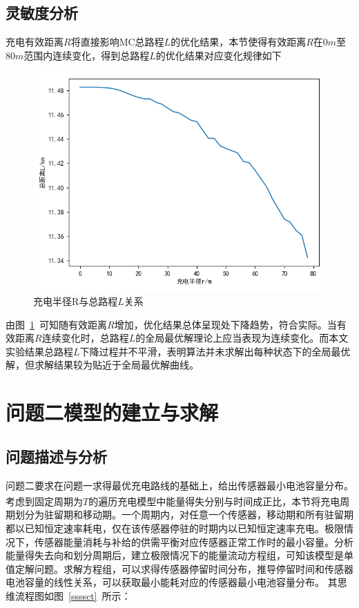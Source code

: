 \documentclass{whutmod}
\newcommand{\upcite}[1]{\textsuperscript{\cite{#1}}}
\begin{document}
	\subsection{灵敏度分析}
       充电有效距离$R$将直接影响MC总路程$L$的优化结果，本节使得有效距离$R$在$0m$至$80m$范围内连续变化，得到总路程$L$的优化结果对应变化规律如下
	    \begin{figure}[H]
		\centering
		\includegraphics[width=.8\textwidth]{figures/ssss.png}
		\caption{充电半径R与总路程$L$关系}\label{ssssssssssssss}
		\end{figure}
	由图~\ref{ssssssssssssss}~可知随有效距离$R$增加，优化结果总体呈现处下降趋势，符合实际。当有效距离$R$连续变化时，总路程$L$的全局最优解理论上应当表现为连续变化。而本文实验结果总路程$L$下降过程并不平滑，表明算法并未求解出每种状态下的全局最优解，但求解结果较为贴近于全局最优解曲线。
	\section{问题二模型的建立与求解}
		\subsection{问题描述与分析}

			问题二要求在问题一求得最优充电路线的基础上，给出传感器最小电池容量分布。考虑到固定周期为$T$的遍历充电模型\upcite{7}中能量得失分别与时间成正比，本节将充电周期划分为驻留期和移动期。一个周期内，对任意一个传感器，移动期和所有驻留期都以已知恒定速率耗电，仅在该传感器停驻的时期内以已知恒定速率充电。极限情况下，传感器能量消耗与补给的供需平衡对应传感器正常工作时的最小容量。分析能量得失去向和划分周期后，建立极限情况下的能量流动方程组，可知该模型是单值定解问题。求解方程组，可以求得传感器停留时间分布，推导停留时间和传感器电池容量的线性关系，可以获取最小能耗对应的传感器最小电池容量分布。
			其思维流程图如图~\ref{ssssct}~所示：
			
\end{document}
